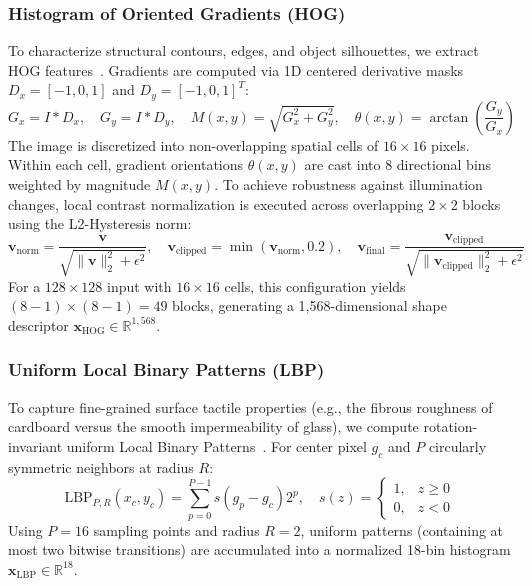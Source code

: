 \documentclass[11pt,a4paper]{article}
\begin{document}
\subsubsection{Histogram of Oriented Gradients (HOG)}
To characterize structural contours, edges, and object silhouettes, we extract HOG features~\cite{dalal2005hog}. Gradients are computed via 1D centered derivative masks $D_x = [-1, 0, 1]$ and $D_y = [-1, 0, 1]^T$:
\begin{equation}
    G_x = I * D_x, \quad G_y = I * D_y, \quad M(x, y) = \sqrt{G_x^2 + G_y^2}, \quad \theta(x, y) = \arctan\left(\frac{G_y}{G_x}\right)
\end{equation}
The image is discretized into non-overlapping spatial cells of $16 \times 16$ pixels. Within each cell, gradient orientations $\theta(x, y)$ are cast into $8$ directional bins weighted by magnitude $M(x, y)$. To achieve robustness against illumination changes, local contrast normalization is executed across overlapping $2 \times 2$ blocks using the L2-Hysteresis norm:
\begin{equation}
    \mathbf{v}_{\text{norm}} = \frac{\mathbf{v}}{\sqrt{\|\mathbf{v}\|_2^2 + \epsilon^2}}, \quad \mathbf{v}_{\text{clipped}} = \min(\mathbf{v}_{\text{norm}}, 0.2), \quad \mathbf{v}_{\text{final}} = \frac{\mathbf{v}_{\text{clipped}}}{\sqrt{\|\mathbf{v}_{\text{clipped}}\|_2^2 + \epsilon^2}}
\end{equation}
For a $128 \times 128$ input with $16 \times 16$ cells, this configuration yields $(8-1) \times (8-1) = 49$ blocks, generating a 1,568-dimensional shape descriptor $\mathbf{x}_{\text{HOG}} \in \mathbb{R}^{1,568}$.

\subsubsection{Uniform Local Binary Patterns (LBP)}
To capture fine-grained surface tactile properties (e.g., the fibrous roughness of cardboard versus the smooth impermeability of glass), we compute rotation-invariant uniform Local Binary Patterns~\cite{ojala2002lbp}. For center pixel $g_c$ and $P$ circularly symmetric neighbors at radius $R$:
\begin{equation}
    \text{LBP}_{P, R}(x_c, y_c) = \sum_{p=0}^{P-1} s(g_p - g_c) 2^p, \quad s(z) = \begin{cases} 1, & z \ge 0 \\ 0, & z < 0 \end{cases}
\end{equation}
Using $P=16$ sampling points and radius $R=2$, uniform patterns (containing at most two bitwise transitions) are accumulated into a normalized 18-bin histogram $\mathbf{x}_{\text{LBP}} \in \mathbb{R}^{18}$.
\end{document}

